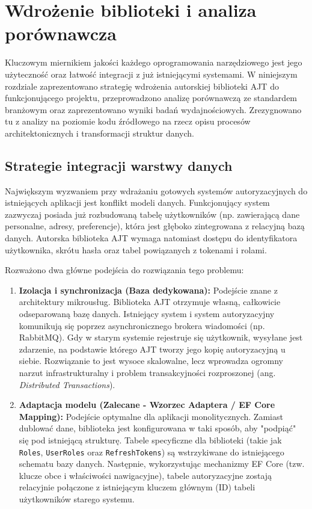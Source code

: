 \documentclass{SGGW-thesis}
\begin{document}
\clearpage

\startchapterfromoddpage
\chapter{Wdrożenie biblioteki i analiza porównawcza}

Kluczowym miernikiem jakości każdego oprogramowania narzędziowego jest jego użyteczność oraz łatwość integracji z już istniejącymi systemami. W niniejszym rozdziale zaprezentowano strategię wdrożenia autorskiej biblioteki AJT do funkcjonującego projektu, przeprowadzono analizę porównawczą ze standardem branżowym oraz zaprezentowano wyniki badań wydajnościowych. Zrezygnowano tu z analizy na poziomie kodu źródłowego na rzecz opisu procesów architektonicznych i transformacji struktur danych.

\section{Strategie integracji warstwy danych}

Największym wyzwaniem przy wdrażaniu gotowych systemów autoryzacyjnych do istniejących aplikacji jest konflikt modeli danych. Funkcjonujący system zazwyczaj posiada już rozbudowaną tabelę użytkowników (np. zawierającą dane personalne, adresy, preferencje), która jest głęboko zintegrowana z relacyjną bazą danych. Autorska biblioteka AJT wymaga natomiast dostępu do identyfikatora użytkownika, skrótu hasła oraz tabel powiązanych z tokenami i rolami.

Rozważono dwa główne podejścia do rozwiązania tego problemu:
\begin{enumerate}
    \item \textbf{Izolacja i synchronizacja (Baza dedykowana):} Podejście znane z architektury mikrousług. Biblioteka AJT otrzymuje własną, całkowicie odseparowaną bazę danych. Istniejący system i system autoryzacyjny komunikują się poprzez asynchronicznego brokera wiadomości (np. RabbitMQ). Gdy w starym systemie rejestruje się użytkownik, wysyłane jest zdarzenie, na podstawie którego AJT tworzy jego kopię autoryzacyjną u siebie. Rozwiązanie to jest wysoce skalowalne, lecz wprowadza ogromny narzut infrastrukturalny i problem transakcyjności rozproszonej (ang. \textit{Distributed Transactions}).
    
    \item \textbf{Adaptacja modelu (Zalecane - Wzorzec Adaptera / EF Core Mapping):} Podejście optymalne dla aplikacji monolitycznych. Zamiast dublować dane, biblioteka jest konfigurowana w taki sposób, aby "podpiąć" się pod istniejącą strukturę. Tabele specyficzne dla biblioteki (takie jak \texttt{Roles}, \texttt{UserRoles} oraz \texttt{RefreshTokens}) są wstrzykiwane do istniejącego schematu bazy danych. Następnie, wykorzystując mechanizmy EF Core (tzw. klucze obce i właściwości nawigacyjne), tabele autoryzacyjne zostają relacyjnie połączone z istniejącym kluczem głównym (ID) tabeli użytkowników starego systemu. 
\end{enumerate}
\end{document}
